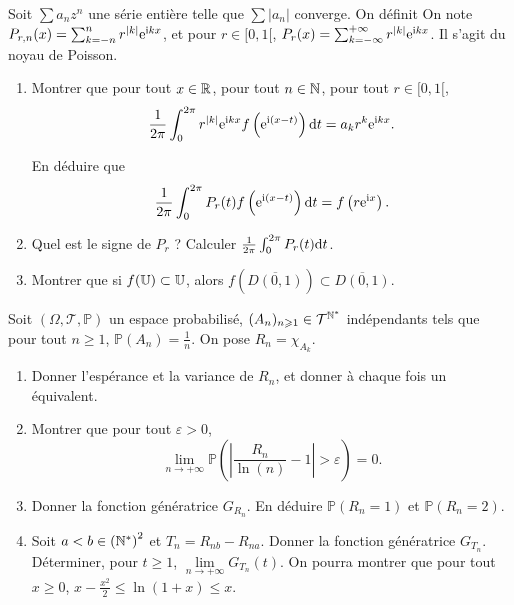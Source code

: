 \documentclass[12pt]{article}
\begin{document}
\begin{exercise}
    Soit $\sum a_n z^{n}$ une série entière telle que $\sum\left\lvert a_n\right\rvert$ converge. On définit 
    On note $P_{r,n}(x)=\sum_{k=-n}^{n}r^{\left\lvert k\right\rvert}\mathrm{e}^{\mathrm{i} kx}$, et pour $r\in[0,1[$, $P_r(x)=\sum_{k=-\infty}^{+\infty}r^{\left\lvert k\right\rvert}\mathrm{e}^{\mathrm{i} kx}$. Il s'agit du noyau de Poisson.

    \begin{enumerate}
        \item Montrer que pour tout $x\in\mathbb{R}$, pour tout $n\in\mathbb{N}$, pour tout $r\in[0,1[$, 
        \begin{equation}
            \frac{1}{2\pi}\int_{0}^{2\pi}r^{\left\lvert k\right\rvert}\mathrm{e}^{\mathrm{i} kx}f\left(\mathrm{e}^{\mathrm{i}(x-t)}\right)\mathrm{d} t=a_k r^{k}\mathrm{e}^{\mathrm{i} kx}.
        \end{equation}
        
        En déduire que
        \begin{equation}
            \frac{1}{2\pi}\int_{0}^{2\pi}P_r(t)f\left(\mathrm{e}^{\mathrm{i}(x-t)}\right)\mathrm{d} t=f\left(r\mathrm{e}^{\mathrm{i} x}\right).
        \end{equation}

        \item Quel est le signe de $P_r$ ? Calculer $\frac{1}{2\pi}\int_{0}^{2\pi}P_r(t)\mathrm{d} t$.
        \item Montrer que si $f(\mathbb{U})\subset\mathbb{U}$, alors $f\left(\overline{D(0,1)}\right)\subset\overline{D(0,1)}$.
    \end{enumerate}
\end{exercise}

\begin{exercise}
    Soit $(\Omega,\mathcal{T},\mathbb{P})$ un espace probabilisé, $(A_n)_{n\geqslant1}\in\mathcal{T}^{\mathbb{N}^{*}}$ indépendants tels que pour tout $n\geqslant1$, $\mathbb{P}\left(A_n\right)=\frac{1}{n}$. On pose $R_n=\chi_{A_{k}}$.
    \begin{enumerate}
        \item Donner l'espérance et la variance de $R_n$, et donner à chaque fois un équivalent.
        \item Montrer que pour tout $\varepsilon>0$, 
        \begin{equation}
            \lim\limits_{n\to+\infty}\mathbb{P}\left(\left\lvert\frac{R_n}{\ln(n)}-1\right\rvert>\varepsilon\right)=0.
        \end{equation}
        \item Donner la fonction génératrice $G_{R_n}$. En déduire $\mathbb{P}(R_n=1)$ et $\mathbb{P}(R_n=2)$.
        \item Soit $a<b\in\left(\mathbb{N}^{*}\right)^{2}$ et $T_n=R_{nb}-R_{na}$. Donner la fonction génératrice $G_{T_n}$. Déterminer, pour $t\geqslant1$, $\lim\limits_{n\to+\infty}G_{T_n}(t)$. On pourra montrer que pour tout $x\geqslant0$, $x-\frac{x^{2}}{2}\leqslant\ln(1+x)\leqslant x$.
    \end{enumerate}
\end{exercise}
\end{document}
